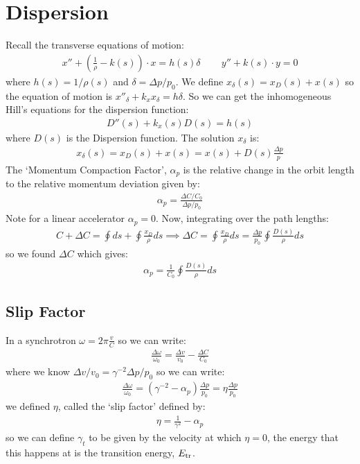 \documentclass{article}
\numberwithin{equation}{section}
\begin{document}
\section{Dispersion}
Recall the transverse equations of motion:
\begin{align}
x'' + \left( \frac{1}{\rho}- k(s) \right)\cdot x = h(s) \delta \, \qquad
y'' + k(s) \cdot y = 0
\end{align}
where $h(s) = 1/\rho(s)$ and $\delta= \Delta p / p_0$. We define $x_\delta(s) = x_D(s) + x(s)$ so the equation of motion is $x''_\delta + k_x x_\delta = h \delta$. So we can get the inhomogeneous Hill's equations for the dispersion function:
\begin{align}
D''(s) + k_x(s)D(s) = h(s)
\end{align}
where $D(s)$ is the Dispersion function. The solution $x_\delta$ is:
\begin{align}
x_\delta(s) = x_D(s) + x(s) = x(s) + D(s)\frac{\Delta p}{p}
\end{align}
The `Momentum Compaction Factor', $\alpha_p$ is the relative change in the orbit length to the relative momentum deviation given by:
\begin{align}
\alpha_p = \frac{\Delta C/C_0}{\Delta p / p_0}
\end{align}
Note for a linear accelerator $\alpha_p = 0$. Now, integrating over the path lengths:
\begin{align}
C+\Delta C = \oint ds + \oint \frac{x_D}{\rho}ds \implies \Delta C = \oint \frac{x_D}{\rho}ds = \frac{\Delta p}{p_0}\oint \frac{D(s)}{\rho}ds
\end{align}
so we found $\Delta C$ which gives:
\begin{align}
\alpha_p = \frac{1}{C_0} \oint \frac{D(s)}{\rho}ds
\end{align}

\subsection{ Slip Factor }

In a synchrotron $\omega = 2 \pi \frac{v}{C}$ so we can write:
\begin{align}
\frac{\Delta \omega}{\omega_0} = \frac{\Delta v}{v_0} - \frac{\Delta C}{C_0}
\end{align}
where we know $\Delta v/v_0 = \gamma^{-2} \Delta p / p_0$ so we can write:
\begin{align}
\frac{\Delta \omega}{\omega_0} = \left( \gamma^{-2} - \alpha_p \right)  \frac{\Delta p}{p_0} = \eta \frac{\Delta p}{p_0}
\end{align}
we defined $\eta$, called the `slip factor' defined by:
\begin{align}
\eta = \frac{1}{\gamma^2} - \alpha_p 
\end{align}
so we can define $\gamma_t$ to be given by the velocity at which $\eta=0$, the energy that this happens at is the transition energy, $E_{\rm tr}$. 
\end{document}
